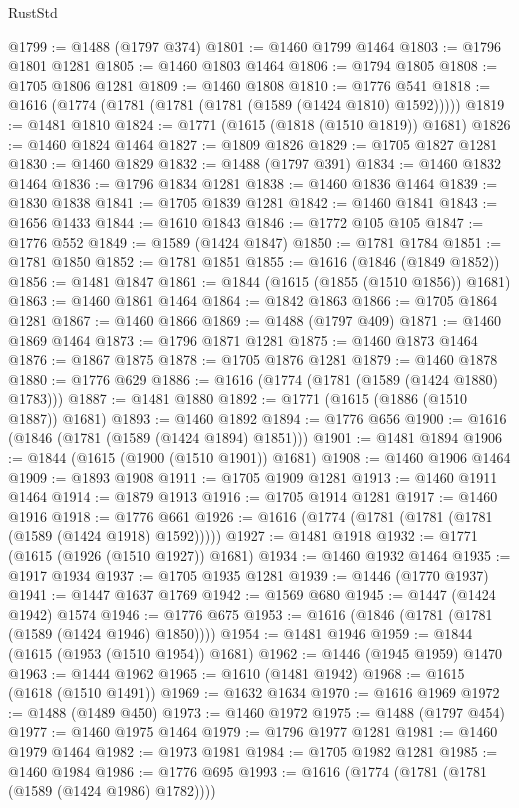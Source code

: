\begin{lexlean}{RustStd}
\begin{coremodule}
@1799 := @1488 (@1797 @374)
@1801 := @1460 @1799 @1464
@1803 := @1796 @1801 @1281
@1805 := @1460 @1803 @1464
@1806 := @1794 @1805
@1808 := @1705 @1806 @1281
@1809 := @1460 @1808
@1810 := @1776 @541
@1818 := @1616 (@1774 (@1781 (@1781 (@1781 (@1589 (@1424 @1810) @1592)))))
@1819 := @1481 @1810
@1824 := @1771 (@1615 (@1818 (@1510 @1819)) @1681)
@1826 := @1460 @1824 @1464
@1827 := @1809 @1826
@1829 := @1705 @1827 @1281
@1830 := @1460 @1829
@1832 := @1488 (@1797 @391)
@1834 := @1460 @1832 @1464
@1836 := @1796 @1834 @1281
@1838 := @1460 @1836 @1464
@1839 := @1830 @1838
@1841 := @1705 @1839 @1281
@1842 := @1460 @1841
@1843 := @1656 @1433
@1844 := @1610 @1843
@1846 := @1772 @105 @105
@1847 := @1776 @552
@1849 := @1589 (@1424 @1847)
@1850 := @1781 @1784
@1851 := @1781 @1850
@1852 := @1781 @1851
@1855 := @1616 (@1846 (@1849 @1852))
@1856 := @1481 @1847
@1861 := @1844 (@1615 (@1855 (@1510 @1856)) @1681)
@1863 := @1460 @1861 @1464
@1864 := @1842 @1863
@1866 := @1705 @1864 @1281
@1867 := @1460 @1866
@1869 := @1488 (@1797 @409)
@1871 := @1460 @1869 @1464
@1873 := @1796 @1871 @1281
@1875 := @1460 @1873 @1464
@1876 := @1867 @1875
@1878 := @1705 @1876 @1281
@1879 := @1460 @1878
@1880 := @1776 @629
@1886 := @1616 (@1774 (@1781 (@1589 (@1424 @1880) @1783)))
@1887 := @1481 @1880
@1892 := @1771 (@1615 (@1886 (@1510 @1887)) @1681)
@1893 := @1460 @1892
@1894 := @1776 @656
@1900 := @1616 (@1846 (@1781 (@1589 (@1424 @1894) @1851)))
@1901 := @1481 @1894
@1906 := @1844 (@1615 (@1900 (@1510 @1901)) @1681)
@1908 := @1460 @1906 @1464
@1909 := @1893 @1908
@1911 := @1705 @1909 @1281
@1913 := @1460 @1911 @1464
@1914 := @1879 @1913
@1916 := @1705 @1914 @1281
@1917 := @1460 @1916
@1918 := @1776 @661
@1926 := @1616 (@1774 (@1781 (@1781 (@1781 (@1589 (@1424 @1918) @1592)))))
@1927 := @1481 @1918
@1932 := @1771 (@1615 (@1926 (@1510 @1927)) @1681)
@1934 := @1460 @1932 @1464
@1935 := @1917 @1934
@1937 := @1705 @1935 @1281
@1939 := @1446 (@1770 @1937)
@1941 := @1447 @1637 @1769
@1942 := @1569 @680
@1945 := @1447 (@1424 @1942) @1574
@1946 := @1776 @675
@1953 := @1616 (@1846 (@1781 (@1781 (@1589 (@1424 @1946) @1850))))
@1954 := @1481 @1946
@1959 := @1844 (@1615 (@1953 (@1510 @1954)) @1681)
@1962 := @1446 (@1945 @1959) @1470
@1963 := @1444 @1962
@1965 := @1610 (@1481 @1942)
@1968 := @1615 (@1618 (@1510 @1491))
@1969 := @1632 @1634
@1970 := @1616 @1969
@1972 := @1488 (@1489 @450)
@1973 := @1460 @1972
@1975 := @1488 (@1797 @454)
@1977 := @1460 @1975 @1464
@1979 := @1796 @1977 @1281
@1981 := @1460 @1979 @1464
@1982 := @1973 @1981
@1984 := @1705 @1982 @1281
@1985 := @1460 @1984
@1986 := @1776 @695
@1993 := @1616 (@1774 (@1781 (@1781 (@1589 (@1424 @1986) @1782))))

\end{coremodule}
\end{lexlean}
